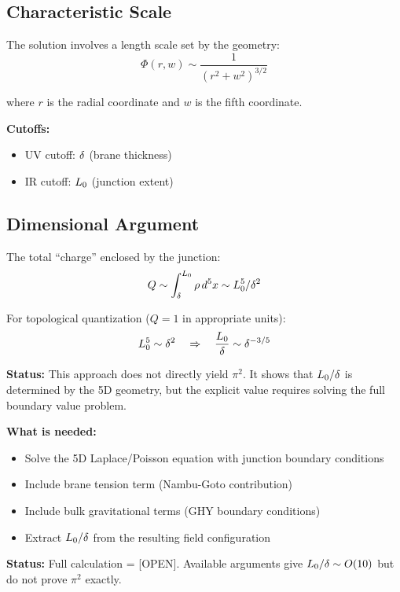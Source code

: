 \subsection{Characteristic Scale}

The solution involves a length scale set by the geometry:
\begin{equation}
    \Phi(r, w) \sim \frac{1}{(r^2 + w^2)^{3/2}}
\end{equation}

where $r$ is the radial coordinate and $w$ is the fifth coordinate.

\textbf{Cutoffs:}
\begin{itemize}
    \item UV cutoff: $\delta$ (brane thickness)
    \item IR cutoff: $L_0$ (junction extent)
\end{itemize}

\subsection{Dimensional Argument}

The total ``charge'' enclosed by the junction:
\begin{equation}
    Q \sim \int_{\delta}^{L_0} \rho \, d^5x \sim L_0^5 / \delta^2
\end{equation}

For topological quantization ($Q = 1$ in appropriate units):
\begin{equation}
    L_0^5 \sim \delta^2 \quad \Rightarrow \quad \frac{L_0}{\delta} \sim \delta^{-3/5}
\end{equation}

\textbf{Status:} This approach does not directly yield $\pi^2$. It shows that
$L_0/\delta$ is determined by the 5D geometry, but the explicit value
requires solving the full boundary value problem.

\begin{edcopenbox}[title=Open: Rigorous 5D Derivation]
    \textbf{What is needed:}
    \begin{itemize}
        \item Solve the 5D Laplace/Poisson equation with junction boundary
              conditions
        \item Include brane tension term (Nambu-Goto contribution)
        \item Include bulk gravitational terms (GHY boundary conditions)
        \item Extract $L_0/\delta$ from the resulting field configuration
    \end{itemize}

    \textbf{Status:} Full calculation = [OPEN]. Available arguments give
    $L_0/\delta \sim O(10)$ but do not prove $\pi^2$ exactly.
    \tagOpen
\end{edcopenbox}

